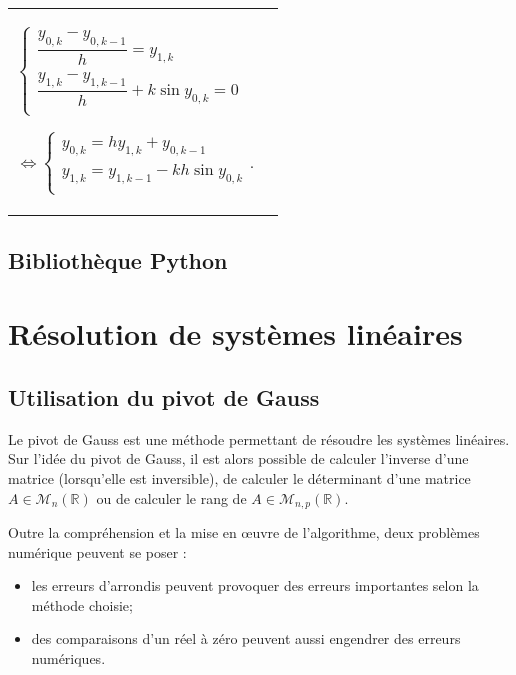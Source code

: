 \begin{itemize}[label=,font=\color{ocre}]
\begin{center}
\begin{tabular}{p{.47\linewidth}|p{.47\linewidth}}
$
\left\{
\begin{array}{l}
\dfrac{y_{0,k}-y_{0,k-1}}{h} = y_{1,k} \\
\dfrac{y_{1,k}-y_{1,k-1}}{h} + k \sin y_{0,k} = 0 \\
\end{array}
\right.$

$\Leftrightarrow 
\left\{
\begin{array}{l}
y_{0,k} = h y_{1,k}+y_{0,k-1} \\
y_{1,k} = y_{1,k-1} - kh \sin y_{0,k} \\
\end{array}
\right.$.
\end{tabular}
\end{center}



\end{itemize}
\subsection{Bibliothèque Python}

\section{Résolution de systèmes linéaires}
\subsection{Utilisation du pivot de Gauss}

Le pivot de Gauss est une méthode permettant de résoudre les systèmes linéaires. Sur l'idée du pivot de Gauss, il est alors possible de calculer l'inverse d'une matrice (lorsqu'elle est inversible), de calculer le déterminant d'une matrice $A\in\mathcal{M}_n(\mathbb{R})$ ou de calculer le rang de 
$A\in\mathcal{M}_{n,p}(\mathbb{R})$.

Outre la compréhension et la mise en \oe{}uvre de l'algorithme, deux problèmes numérique peuvent se poser : 
\begin{itemize}
\item les erreurs d'arrondis peuvent provoquer des erreurs importantes selon la méthode choisie;
\item des comparaisons d'un réel à zéro peuvent aussi engendrer des erreurs numériques.
\end{itemize}

